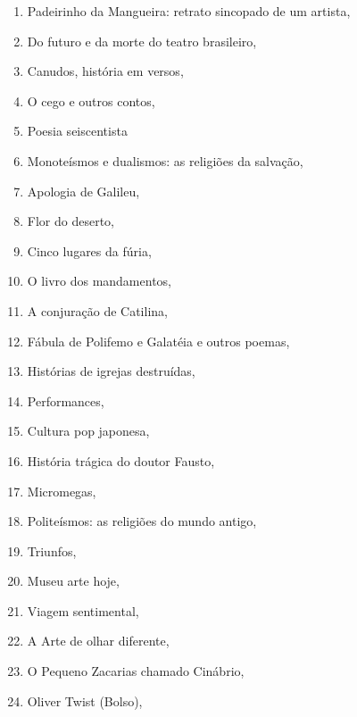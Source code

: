 \begin{multicols}{2}
\begin{enumerate}
\item Padeirinho da Mangueira: retrato sincopado de um artista, {}
\item Do futuro e da morte do teatro brasileiro, {}
\item Canudos, história em versos, {}
\item O cego e outros contos, {}
\item Poesia seiscentista
\item Monoteísmos e dualismos: as religiões da salvação, {}
\item Apologia de Galileu, {}
\item Flor do deserto, {}
\item Cinco lugares da fúria, {}
\item O livro dos mandamentos, {}
\item A conjuração de Catilina, {}
\item Fábula de Polifemo e Galatéia e outros poemas, {}
\item Histórias de igrejas destruídas, {}
\item Performances, {}
\item Cultura pop japonesa, {}
\item História trágica do doutor Fausto, {}
\item Micromegas, {}
\item Politeísmos: as religiões do mundo antigo, {}
\item Triunfos, {}
\item Museu arte hoje, {}
\item Viagem sentimental, {}
\item A Arte de olhar diferente, {}
\item O Pequeno Zacarias chamado Cinábrio, {}
\item Oliver Twist (Bolso), {}

\end{enumerate}
\end{multicols}
